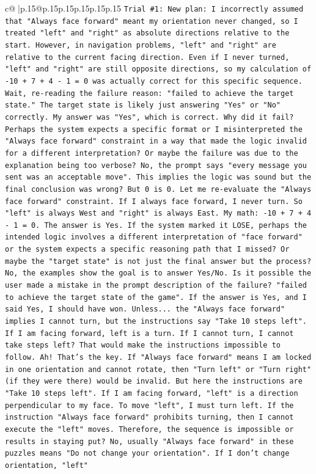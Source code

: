 \documentclass{article}
\begin{document}
{\begin{supertabular}{c@{$\;$}|p{.15\linewidth}@{}p{.15\linewidth}p{.15\linewidth}p{.15\linewidth}p{.15\linewidth}p{.15\linewidth}}
{{{\texttt{Trial \#1: New plan: I incorrectly assumed that "Always face forward" meant my orientation never changed, so I treated "left" and "right" as absolute directions relative to the start. However, in navigation problems, "left" and "right" are relative to the current facing direction. Even if I never turned, "left" and "right" are still opposite directions, so my calculation of {-}10 + 7 + 4 {-} 1 = 0 was actually correct for this specific sequence. Wait, re{-}reading the failure reason: "failed to achieve the target state." The target state is likely just answering "Yes" or "No" correctly. My answer was "Yes", which is correct. Why did it fail? Perhaps the system expects a specific format or I misinterpreted the "Always face forward" constraint in a way that made the logic invalid for a different interpretation? Or maybe the failure was due to the explanation being too verbose? No, the prompt says "every message you sent was an acceptable move". This implies the logic was sound but the final conclusion was wrong? But 0 is 0. Let me re{-}evaluate the "Always face forward" constraint. If I always face forward, I never turn. So "left" is always West and "right" is always East. My math: {-}10 + 7 + 4 {-} 1 = 0. The answer is Yes. If the system marked it LOSE, perhaps the intended logic involves a different interpretation of "face forward" or the system expects a specific reasoning path that I missed? Or maybe the "target state" is not just the final answer but the process? No, the examples show the goal is to answer Yes/No. Is it possible the user made a mistake in the prompt description of the failure? "failed to achieve the target state of the game". If the answer is Yes, and I said Yes, I should have won. Unless... the "Always face forward" implies I cannot turn, but the instructions say "Take 10 steps left". If I am facing forward, left is a turn. If I cannot turn, I cannot take steps left? That would make the instructions impossible to follow. Ah! That's the key. If "Always face forward" means I am locked in one orientation and cannot rotate, then "Turn left" or "Turn right" (if they were there) would be invalid. But here the instructions are "Take 10 steps left". If I am facing forward, "left" is a direction perpendicular to my face. To move "left", I must turn left. If the instruction "Always face forward" prohibits turning, then I cannot execute the "left" moves. Therefore, the sequence is impossible or results in staying put? No, usually "Always face forward" in these puzzles means "Do not change your orientation". If I don't change orientation, "left"} \\
}}}
\end{supertabular}}
\end{document}
